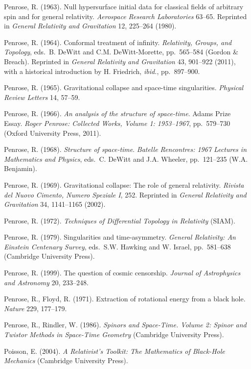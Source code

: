 \documentclass[11pt,a4paper]{article}
\begin{document}
\begin{small}
\begin{thebibliography}{99}
 \item[]  Penrose, R. (1963).  Null hypersurface initial data for classical fields of arbitrary spin and for general relativity.
 \emph{Aerospace Research Laboratories} 63--65. Reprinted in \emph{General Relativity and Gravitation} 12, 225--264 (1980).
 \item[]  Penrose, R. (1964). Conformal treatment of infinity. \emph{Relativity, Groups, and Topology}, eds.\  B. DeWitt and C.M. DeWitt-Morette,  pp.\ 565--584 (Gordon \& Breach). Reprinted in \emph{General Relativity and Gravitation} 43, 901--922 (2011), with a historical introduction by H. Friedrich, \emph{ibid.}, pp.\ 897--900. 
  \item[]  Penrose, R. (1965). Gravitational collapse and space-time singularities. \emph{Physical Review Letters} 14, 57--59.
\item[] Penrose, R. (1966). \emph{An analysis of the structure of space-time}. Adams Prize Essay. \emph{Roger Penrose: Collected Works, Volume 1: 1953--1967}, pp.\ 579--730 (Oxford University Press, 2011). 
\item[] Penrose, R. (1968). \emph{Structure of space-time}.
\emph{Batelle Rencontres: 1967 Lectures in Mathematics and Physics}, eds.\  
 C. DeWitt and J.A. Wheeler, pp.\ 121--235 (W.A. Benjamin). 
    \item[]  Penrose, R. (1969).
      Gravitational collapse: The role of general relativity. \emph{ 
Rivista del Nuovo Cimento, Numero Speziale I}, 252.
      Reprinted in \emph{General Relativity and Gravitation}  34, 1141--1165 (2002).
    \item[]  Penrose, R. (1972). \emph{Techniques of Differential Topology in Relativity} (SIAM). 
        \item[]  Penrose, R. (1979). Singularities and time-asymmetry. \emph{General Relativity: An Einstein Centenary Survey},
        eds.\ S.W. Hawking and W. Israel, pp.\  581--638  (Cambridge University Press). 
      \item[]  Penrose, R. (1999).  The question of cosmic censorship. \emph{Journal of Astrophysics and Astronomy} 20, 233--248.   
      \item[]   Penrose, R.,  Floyd, R. (1971). Extraction of rotational energy from a black hole. \emph{Nature} 229, 
 177--179.
         \item[]  Penrose, R., Rindler, W. (1986). \emph{Spinors and Space-Time. Volume 2: Spinor and Twistor Methods in Space-Time Geometry} (Cambridge University Press).     
  \item[] Poisson, E. (2004). \emph{A Relativist's Toolkit: The Mathematics of Black-Hole Mechanics} (Cambridge University Press).     

\end{thebibliography}
\end{small}
\end{document}
